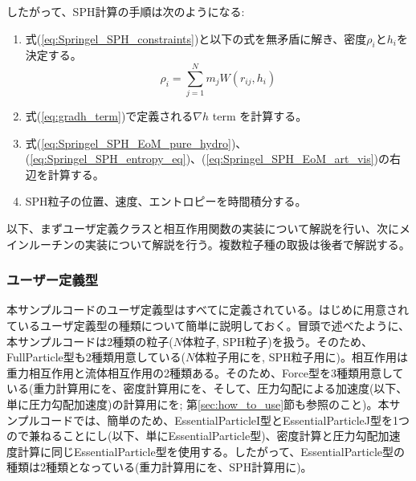 したがって、SPH計算の手順は次のようになる:
\begin{screen}
\begin{enumerate}[leftmargin=*,itemsep=-1ex,label={(\arabic*)}]
\item 式(\ref{eq:Springel_SPH_constraints})と以下の式を無矛盾に解き、密度$\rho_{i}$と$h_{i}$を決定する。
\begin{equation}
\rho_{i} = \sum^{N}_{j=1}m_{j}W(r_{ij},h_{i}) \label{eq:SPH_density_def}
\end{equation}
\item 式(\ref{eq:gradh_term})で定義される$\nabla h$ term を計算する。
\item 式(\ref{eq:Springel_SPH_EoM_pure_hydro})、(\ref{eq:Springel_SPH_entropy_eq})、(\ref{eq:Springel_SPH_EoM_art_vis})の右辺を計算する。
\item SPH粒子の位置、速度、エントロピーを時間積分する。
\end{enumerate}
\end{screen}



以下、まずユーザ定義クラスと相互作用関数の実装について解説を行い、次にメインルーチンの実装について解説を行う。複数粒子種の取扱は後者で解説する。

\subsubsection{ユーザー定義型}
本サンプルコードのユーザ定義型はすべてに定義されている。はじめに用意されているユーザ定義型の種類について簡単に説明しておく。冒頭で述べたように、本サンプルコードは2種類の粒子($N$体粒子, SPH粒子)を扱う。そのため、FullParticle型も2種類用意している($N$体粒子用にを, SPH粒子用に)。相互作用は重力相互作用と流体相互作用の2種類ある。そのため、Force型を3種類用意している(重力計算用にを、密度計算用にを、そして、圧力勾配による加速度(以下、単に圧力勾配加速度)の計算用にを; 第\ref{sec:how_to_use}節も参照のこと)。本サンプルコードでは、簡単のため、EssentialParticleI型とEssentialParticleJ型を1つの\structure で兼ねることにし(以下、単にEssentialParticle型)、密度計算と圧力勾配加速度計算に同じEssentialParticle型を使用する。したがって、EssentialParticle型の種類は2種類となっている(重力計算用にを、SPH計算用に)。

